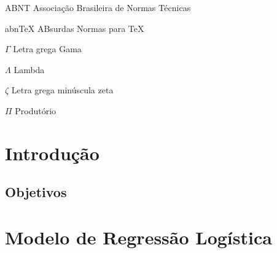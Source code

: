 \documentclass[
	12pt,				%
	openright,			%
	oneside,      %
	a4paper,			%
	english,			%
	french,				%
	spanish,			%
	brazil,				%
	]{abntex2}\usepackage[]{graphicx}\usepackage[]{xcolor}
\begin{document}
\listoffigures*
\cleardoublepage

\listoftables*
\cleardoublepage

\begin{siglas}
  \item[ABNT] Associação Brasileira de Normas Técnicas
  \item[abnTeX] ABsurdas Normas para TeX
\end{siglas}

\begin{simbolos}
  \item[$ \Gamma $] Letra grega Gama
  \item[$ \Lambda $] Lambda
  \item[$ \zeta $] Letra grega minúscula zeta
  \item[$ \Pi $] Produtório
\end{simbolos}

\tableofcontents*
\cleardoublepage

\textual

\chapter[Introdução]{Introdução}



\section{Objetivos}







\chapter{Modelo de Regressão Logística}
\end{document}
